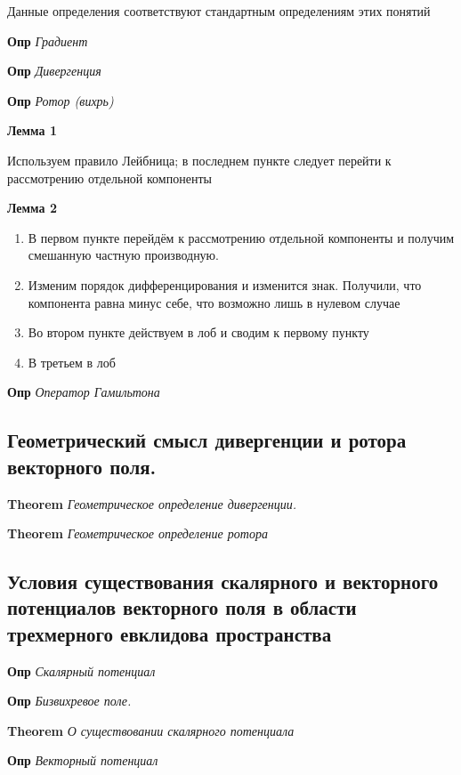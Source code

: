 \documentclass[a4paper, 14pt]{article}
\begin{document}
    Данные определения соответствуют стандартным определениям этих понятий
    
    \textbf{Опр} \textit{Градиент}
    
    \textbf{Опр} \textit{Дивергенция}
    
    \textbf{Опр} \textit{Ротор (вихрь)}
    
    \textbf{Лемма 1}
    
    Используем правило Лейбница; в последнем пункте следует перейти к рассмотрению отдельной компоненты
    
    \textbf{Лемма 2}
    
    \begin{enumerate}
        \item В первом пункте перейдём к рассмотрению отдельной компоненты и получим смешанную частную производную.
        \item Изменим порядок дифференцирования и изменится знак.
        Получили, что компонента равна минус себе, что возможно лишь в нулевом случае
        \item Во втором пункте действуем в лоб и сводим к первому пункту
        \item В третьем в лоб
    \end{enumerate}
    
    \textbf{Опр} \textit{Оператор Гамильтона}
    
    \subsection{Геометрический смысл дивергенции и ротора векторного поля.}
    
    \textbf{Theorem} \textit{Геометрическое определение дивергенции.}
    
    \textbf{Theorem} \textit{Геометрическое определение ротора}
    
    \subsection{Условия существования скалярного и векторного потенциалов векторного поля в области трехмерного
    евклидова пространства}
    
    \textbf{Опр} \textit{Скалярный потенциал}
    
    \textbf{Опр} \textit{Бизвихревое поле.}
    
    \textbf{Theorem} \textit{О существовании скалярного потенциала}
    
    \textbf{Опр} \textit{Векторный потенциал}
    
\end{document}
